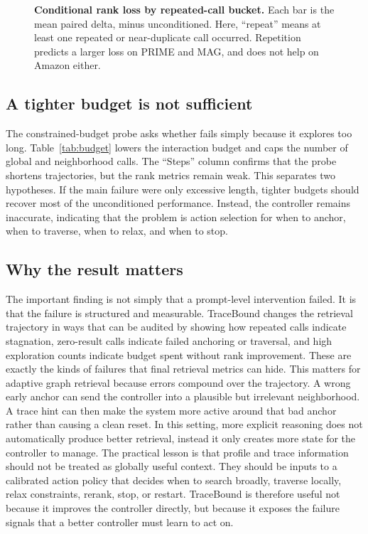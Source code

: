 \begin{figure}[t]
\centering
\resizebox{\columnwidth}{!}{}
\caption{\textbf{Conditional rank loss by repeated-call bucket.} Each bar is the mean paired \mrr delta, \tb minus unconditioned. Here, ``repeat'' means at least one repeated or near-duplicate call occurred. Repetition predicts a larger loss on PRIME and MAG, and does not help on Amazon either.}
\label{fig:repeat_delta}
\end{figure}

\subsection{A tighter budget is not sufficient}
The constrained-budget probe asks whether \tb fails simply because it explores too long. Table~\ref{tab:budget} lowers the interaction budget and caps the number of global and neighborhood calls. The ``Steps'' column confirms that the probe shortens trajectories, but the rank metrics remain weak. This separates two hypotheses. If the main failure were only excessive length, tighter budgets should recover most of the unconditioned performance. Instead, the controller remains inaccurate, indicating that the problem is action selection for when to anchor, when to traverse, when to relax, and when to stop.

\subsection{Why the result matters}
The important finding is not simply that a prompt-level intervention failed. It is that the failure is structured and measurable. TraceBound changes the retrieval trajectory in ways that can be audited by showing how repeated calls indicate stagnation, zero-result calls indicate failed anchoring or traversal, and high exploration counts indicate budget spent without rank improvement. These are exactly the kinds of failures that final retrieval metrics can hide. This matters for adaptive graph retrieval because errors compound over the trajectory. A wrong early anchor can send the controller into a plausible but irrelevant neighborhood. A trace hint can then make the system more active around that bad anchor rather than causing a clean reset. In this setting, more explicit reasoning does not automatically produce better retrieval, instead it only creates more state for the controller to manage. The practical lesson is that profile and trace information should not be treated as globally useful context. They should be inputs to a calibrated action policy that decides when to search broadly, traverse locally, relax constraints, rerank, stop, or restart. TraceBound is therefore useful not because it improves the controller directly, but because it exposes the failure signals that a better controller must learn to act on.

